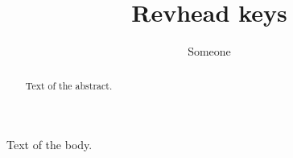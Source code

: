 \documentclass[aps,showkeys,showpacs]{revtex4-2}
\begin{document}
\title{Revhead keys}
\author{Someone}
\begin{abstract}
Text of the abstract.
\end{abstract}
\maketitle
Text of the body.
\end{document}

